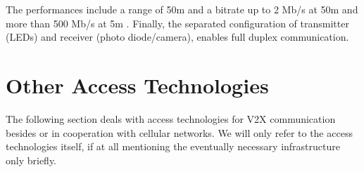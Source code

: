 \documentclass[conference,12pt,onecolumn]{IEEEtran}
\begin{document}
\begin{itemize}
The performances include a range of 50m and a bitrate up to 2 Mb/s at 50m and more than 500 Mb/s at 5m \cite{yu2013}. Finally, the separated configuration of transmitter (LEDs) and receiver (photo diode/camera), enables full duplex communication.
\end{itemize}

\cite{5gamericas2018}








\section{Other Access Technologies}
The following section deals with access technologies for V2X communication besides or in cooperation with cellular networks. We will only refer to the access technologies itself, if at all mentioning the eventually necessary infrastructure only briefly.
\end{document}
